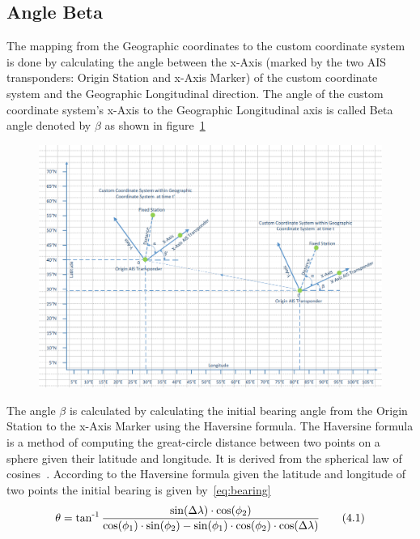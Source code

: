 \subsection{Angle Beta}
\label{subsec:subsec4_3_1}
\noindent
The mapping from the Geographic coordinates to the custom coordinate system is done by calculating the angle between the x-Axis (marked by the two AIS transponders: Origin Station and x-Axis Marker) of the custom coordinate system and the Geographic Longitudinal direction. The angle of the custom coordinate system's x-Axis to the Geographic Longitudinal axis is called Beta angle denoted by $\beta$ as shown in figure~\ref{fig:CH4CoordinateSystemDef}
\begin{figure}[h]
	\centering
	\includegraphics[height=0.45\textheight]{fig04/AngleBetaDef.png}
	\label{fig:CH4CoordinateSystemDef}
\end{figure} 
\newline
\noindent
The angle $\beta$ is calculated by calculating the initial bearing angle from the Origin Station to the x-Axis Marker using the Haversine formula. The Haversine formula is a method of computing the great-circle distance between two points on a sphere given their latitude and longitude. It is derived from the spherical law of cosines~\cite{haversineDef}. According to the Haversine formula given the latitude and longitude of two points the initial bearing is given by~\ref{eq:bearing}~\cite{haversineBear}
	\begin{equation} \label{eq:bearing}
		\theta = \operatorname{tan^{-1}}\frac{\sin(\Delta\lambda)\cdot\cos(\phi_{2})}{\cos(\phi_{1})\cdot\sin(\phi_{2}) - \sin(\phi_{1})\cdot\cos(\phi_{2})\cdot\cos(\Delta\lambda)}
		\tag{4.1}		
	\end{equation}
